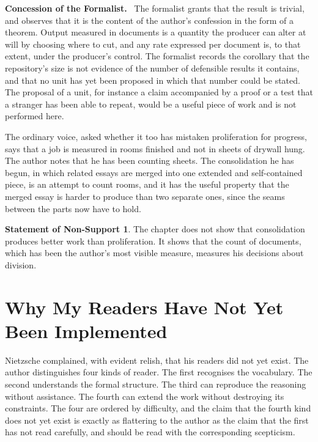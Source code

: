 \documentclass[11pt,openany,twoside]{book}
\theoremstyle{plain}
\theoremstyle{definition}
\newtheorem{nonsupport}{Statement of Non-Support}
\theoremstyle{remark}
\newenvironment{concession}{\par\medskip\noindent\textbf{Concession of the Formalist.}\ }{\par\medskip}
\begin{document}
\begin{concession}
The formalist grants that the result is trivial, and observes that it is the content of the author's confession in the form of a theorem. Output measured in documents is a quantity the producer can alter at will by choosing where to cut, and any rate expressed per document is, to that extent, under the producer's control. The formalist records the corollary that the repository's size is not evidence of the number of defensible results it contains, and that no unit has yet been proposed in which that number could be stated. The proposal of a unit, for instance a claim accompanied by a proof or a test that a stranger has been able to repeat, would be a useful piece of work and is not performed here.
\end{concession}

The ordinary voice, asked whether it too has mistaken proliferation for progress, says that a job is measured in rooms finished and not in sheets of drywall hung. The author notes that he has been counting sheets. The consolidation he has begun, in which related essays are merged into one extended and self-contained piece, is an attempt to count rooms, and it has the useful property that the merged essay is harder to produce than two separate ones, since the seams between the parts now have to hold.

\begin{nonsupport}
The chapter does not show that consolidation produces better work than proliferation. It shows that the count of documents, which has been the author's most visible measure, measures his decisions about division.
\end{nonsupport}

\chapter{Why My Readers Have Not Yet Been Implemented}

Nietzsche complained, with evident relish, that his readers did not yet exist. The author distinguishes four kinds of reader. The first recognises the vocabulary. The second understands the formal structure. The third can reproduce the reasoning without assistance. The fourth can extend the work without destroying its constraints. The four are ordered by difficulty, and the claim that the fourth kind does not yet exist is exactly as flattering to the author as the claim that the first has not read carefully, and should be read with the corresponding scepticism.
\end{document}
